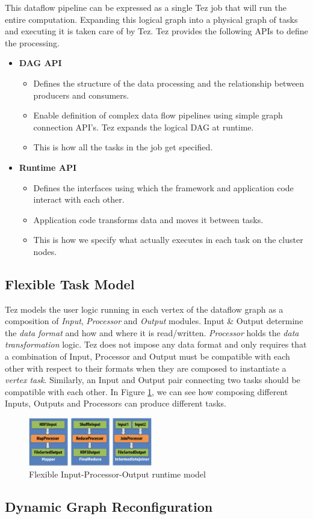 \documentclass[twocolumn]{article}
\newcommand{\bi}{\begin{itemize}}
\newcommand{\ei}{\end{itemize}}
\newcommand{\ii}{\item}
\begin{document}
This dataflow pipeline can be expressed as a single Tez job that will run the
entire computation. Expanding this logical graph into a physical graph
of tasks and executing it is taken care of by Tez.
Tez provides the following APIs to define the processing.

\bi
\ii \textbf{DAG API}
\bi
\ii Defines the structure of the data processing and the relationship between producers and consumers.
\ii Enable definition of complex data flow pipelines using simple graph connection API’s. Tez expands the logical DAG at runtime.
\ii This is how all the tasks in the job get specified.
\ei
\ii \textbf{Runtime API}
\bi
\ii Defines the interfaces using which the framework and application code interact with each other.
\ii Application code transforms data and moves it between tasks.
\ii This is how we specify what actually executes in each task on the cluster nodes.
\ei
\ei

\subsection{Flexible Task Model}
Tez models the user logic running in each vertex of the dataflow graph
as a composition of \emph{Input}, \emph{Processor} and
\emph{Output} modules. Input \& Output determine the \emph{data
format} and how and where it is read/written. \emph{Processor} holds the
\emph{data transformation} logic. Tez does not impose any data format
and only requires that a combination of Input, Processor and Output must
be compatible with each other with respect to their formats when they
are composed to instantiate a \emph{vertex task}. Similarly, an Input
and Output pair connecting two tasks should be compatible with each
other. In Figure \ref{fig04}, we can see how composing different Inputs,
Outputs and Processors can produce different tasks.

\begin{figure}[htb]
        \centering
        \includegraphics[width=0.48\textwidth]{tez2}
        \caption{Flexible Input-Processor-Output runtime model}
        \label{fig04}
\end{figure}

\subsection{Dynamic Graph Reconfiguration}
\end{document}
